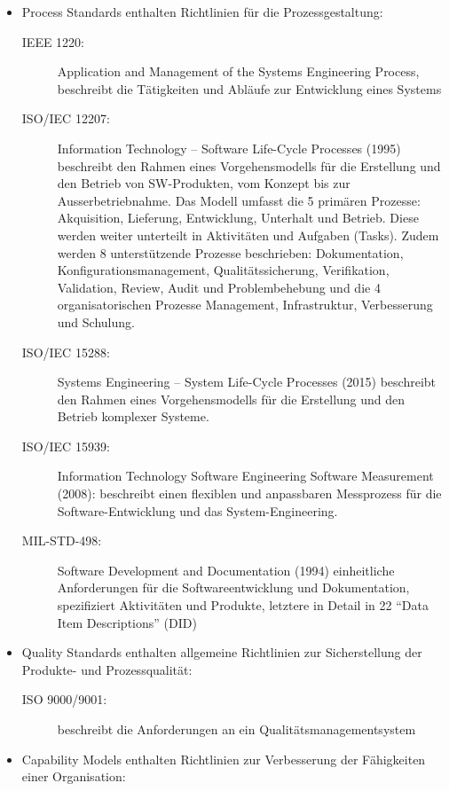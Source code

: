 \begin{itemize}
\item Process Standards enthalten Richtlinien für die
  Prozessgestaltung:
%
\begin{description}
\item [IEEE 1220:] Application and Management of the Systems
  Engineering Process, be\-schreibt die Tätigkeiten und Abläufe zur
  Entwicklung eines Systems
\item[ISO/IEC 12207:] Information Technology -- Software Life-Cycle Processes
  (1995)
  be\-schreibt den Rahmen eines Vorgehensmodells für die Erstellung und den
  Betrieb von SW-Produk\-ten, vom Konzept bis zur Ausserbetriebnahme. Das
  Modell
  umfasst die 5 primären Prozesse: Akquisition, Lieferung, Entwicklung,
  Unterhalt und Betrieb. Diese werden weiter unterteilt in Aktivitäten und
  Aufgaben (Tasks). Zudem werden 8 unterstützende Prozesse beschrieben:
  Dokumentation, Konfigurationsmanagement, Qualitätssicherung, Verifikation,
  Validation, Review, Audit und Problembehebung und die 4 organisatorischen
  Prozesse Management, Infrastruktur, Verbesserung und Schulung.
\newslide
\item[ISO/IEC 15288:] Systems Engineering -- System Life-Cycle Processes (2015)
  beschreibt den Rahmen eines Vorgehensmodells für die Erstellung und den
  Betrieb komplexer Systeme.
\item[ISO/IEC 15939:] Information Technology Software Engineering Software
  Measurement (2008): beschreibt einen flexiblen und anpassbaren Messprozess
  für die Software-Entwicklung und das System-Engineering.
\item[MIL-STD-498:] Software Development and Documentation (1994) einheitliche
  An\-for\-der\-ungen für die Softwareentwicklung und Dokumentation, spezifiziert
  Aktivitäten und Produkte, letztere in Detail in 22 ``Data Item Descriptions'' (DID)
\end{description}
%
\newslide
\item Quality Standards enthalten allgemeine Richtlinien zur Sicherstellung der
  Produkte- und Prozessqualität:
%
\begin{description}
\item [ISO 9000/9001:] beschreibt die Anforderungen an ein
  Qualitätsmanagementsystem
\end{description}
%
\newslide
\item Capability Models enthalten Richtlinien zur Verbesserung der
  Fähigkeiten einer Organisation:
%
\begin{description}

\end{description}
\end{itemize}
